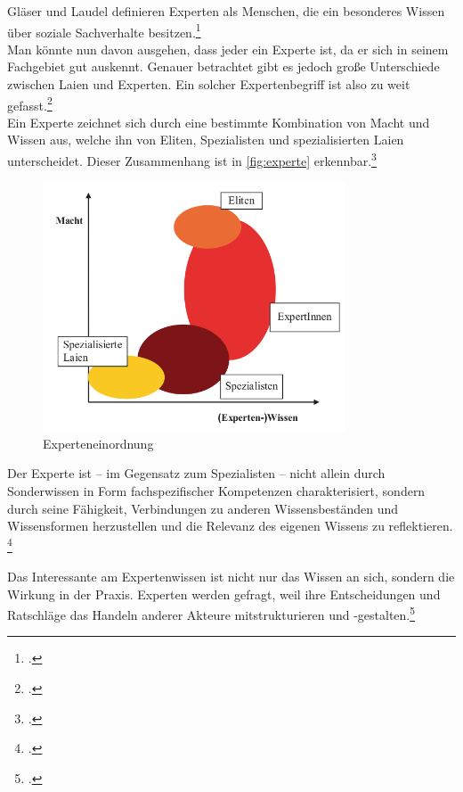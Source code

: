 Gläser und Laudel definieren Experten als Menschen, die ein besonderes Wissen über soziale Sachverhalte besitzen.\footcite[Vgl.][12]{Glaeser_2010_Inhaltsanalyse}\\
Man könnte nun davon ausgehen, dass jeder ein Experte ist, da er sich in seinem Fachgebiet gut auskennt. Genauer betrachtet  gibt es jedoch große Unterschiede zwischen Laien und Experten. Ein solcher Expertenbegriff ist also zu weit gefasst.\footcite[Vgl.][10\psq]{Bogner_2014_Interview}\\
Ein Experte zeichnet sich durch eine bestimmte Kombination von Macht und Wissen aus, welche ihn von Eliten, Spezialisten und spezialisierten Laien unterscheidet. Dieser Zusammenhang ist in  \autoref{fig:experte} erkennbar.\footcite[Vgl.][o. \pno]{Littig_2008}

\begin{figure}[H]
  \centering
  \includegraphics[width=0.8\textwidth]{Anhang/Experte}
  \caption{Experteneinordnung}
\label{fig:experte}
\end{figure}

\glqq{}Der Experte ist -- im Gegensatz zum Spezialisten – nicht allein durch Sonderwissen in Form fachspezifischer Kompetenzen charakterisiert, sondern durch seine Fähigkeit, Verbindungen zu anderen Wissensbeständen und Wissensformen herzustellen und die Relevanz des eigenen Wissens zu reflektieren\grqq.
\footcites[][14]{Bogner_2014_Interview}[Vgl.][21 \psq]{Hitzler_1994}

Das Interessante am Expertenwissen ist nicht nur das Wissen an sich, sondern die Wirkung in der Praxis. Experten werden gefragt, weil ihre Entscheidungen und Ratschläge das Handeln anderer Akteure mitstrukturieren und -gestalten.\footcite[Vgl.][13]{Bogner_2014_Interview}

